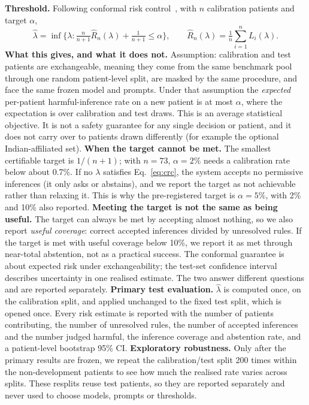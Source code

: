 \documentclass[10pt,a4paper]{article}
\begin{document}
\textbf{Threshold.} Following conformal risk control~\cite{crc}, with \(n\) calibration patients and target \(\alpha\),
\begin{equation}\label{eq:crc}
\hat\lambda=\inf\Big\{\lambda:\tfrac{n}{n+1}\hat R_n(\lambda)+\tfrac{1}{n+1}\le\alpha\Big\},\qquad \hat R_n(\lambda)=\tfrac1n\textstyle\sum_{i=1}^{n}L_i(\lambda).
\end{equation}
\textbf{What this gives, and what it does not.} Assumption: calibration and test patients are exchangeable, meaning they come from the same benchmark pool through one random patient-level split, are masked by the same procedure, and face the same frozen model and prompts. Under that assumption the \emph{expected} per-patient harmful-inference rate on a new patient is at most \(\alpha\), where the expectation is over calibration and test draws. This is an average statistical objective. It is not a safety guarantee for any single decision or patient, and it does not carry over to patients drawn differently (for example the optional Indian-affiliated set). \textbf{When the target cannot be met.} The smallest certifiable target is \(1/(n+1)\); with \(n=73\), \(\alpha=2\%\) needs a calibration rate below about 0.7\%. If no \(\lambda\) satisfies Eq.~\ref{eq:crc}, the system accepts no permissive inferences (it only asks or abstains), and we report the target as not achievable rather than relaxing it. This is why the pre-registered target is \(\alpha=5\%\), with 2\% and 10\% also reported. \textbf{Meeting the target is not the same as being useful.} The target can always be met by accepting almost nothing, so we also report \emph{useful coverage}: correct accepted inferences divided by unresolved rules. If the target is met with useful coverage below 10\%, we report it as met through near-total abstention, not as a practical success. The conformal guarantee is about expected risk under exchangeability; the test-set confidence interval describes uncertainty in one realised estimate. The two answer different questions and are reported separately. \textbf{Primary test evaluation.} \(\hat\lambda\) is computed once, on the calibration split, and applied unchanged to the fixed test split, which is opened once. Every risk estimate is reported with the number of patients contributing, the number of unresolved rules, the number of accepted inferences and the number judged harmful, the inference coverage and abstention rate, and a patient-level bootstrap 95\% CI. \textbf{Exploratory robustness.} Only after the primary results are frozen, we repeat the calibration/test split 200 times within the non-development patients to see how much the realised rate varies across splits. These resplits reuse test patients, so they are reported separately and never used to choose models, prompts or thresholds.
\end{document}

